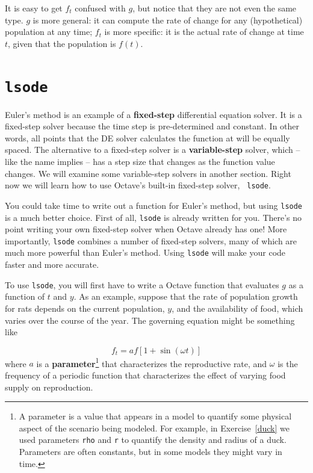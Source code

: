 It is easy to get $f_t$ confused with $g$, but notice that they are
not even the same type. $g$ is more general: it can compute the rate
of change for any (hypothetical) population at any time; $f_t$
is more specific: it is the actual rate of change at time $t$, given
that the population is $f(t)$.

\section{{\tt lsode}}
\label{lsode}

Euler's method is an example of a {\bf fixed-step} differential equation solver.
It is a fixed-step solver because the time step is pre-determined and constant.
In other words, all
points that the DE solver calculates the function at will be equally
spaced. The alternative to a fixed-step solver is a {\bf variable-step} solver,
which -- like the name implies -- has a step size that changes as the function
value changes. We will examine some variable-step solvers in another section.
Right now we will learn how to use Octave's built-in fixed-step solver, {\tt
lsode}.

You could take time to write out a function for Euler's method, but using
{\tt lsode} is a much better choice. First of all, {\tt lsode} is already
written for you. There's no point writing your own fixed-step solver when
Octave already has one! More importantly, {\tt lsode} combines a number of
fixed-step solvers, many of which are much more powerful than
Euler's method. Using {\tt lsode} will make your code faster and more accurate.

To use {\tt lsode}, you will first have to write a Octave function
that evaluates $g$ as a function of
$t$ and $y$. As an example, suppose that the rate of population growth for rats
depends on the current population, $y$, and the availability of food,
which varies over the course of the year.
The governing equation might be something like

\[ f_t = a f \left[1 + \sin (\omega t) \right] \]
%
where $a$ is
a {\bf parameter}\footnote{A parameter is a value that appears
in a model to quantify some physical aspect of the scenario being
modeled. For example, in Exercise~\ref{duck} we used parameters
{\tt rho} and {\tt r} to quantify the density and radius of a
duck. Parameters are often constants, but in some models they
might vary in time.} 
that characterizes the reproductive rate, and
$\omega$ is the frequency of a periodic function that characterizes
the effect of varying food supply on reproduction.

